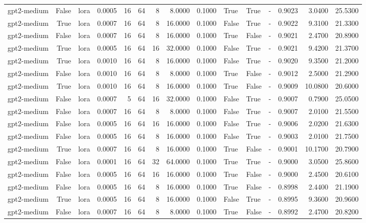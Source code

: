 \begin{tabular}{lrlrrrrrrlllrrr}
gpt2-medium & False & lora & 0.0005 & 16 & 64 & 8 & 8.0000 & 0.1000 & True & True & - & 0.9023 & 3.0400 & 25.5300 \\
gpt2-medium & True & lora & 0.0007 & 16 & 64 & 8 & 16.0000 & 0.1000 & False & True & - & 0.9022 & 9.3100 & 21.3300 \\
gpt2-medium & False & lora & 0.0007 & 16 & 64 & 8 & 16.0000 & 0.1000 & True & False & - & 0.9021 & 2.4700 & 20.8900 \\
gpt2-medium & True & lora & 0.0005 & 16 & 64 & 16 & 32.0000 & 0.1000 & False & True & - & 0.9021 & 9.4200 & 21.3700 \\
gpt2-medium & True & lora & 0.0010 & 16 & 64 & 8 & 16.0000 & 0.1000 & False & True & - & 0.9020 & 9.3500 & 21.2000 \\
gpt2-medium & False & lora & 0.0010 & 16 & 64 & 8 & 8.0000 & 0.1000 & True & False & - & 0.9012 & 2.5000 & 21.2900 \\
gpt2-medium & True & lora & 0.0010 & 16 & 64 & 8 & 16.0000 & 0.1000 & True & False & - & 0.9009 & 10.0800 & 20.6000 \\
gpt2-medium & False & lora & 0.0007 & 5 & 64 & 16 & 32.0000 & 0.1000 & False & True & - & 0.9007 & 0.7900 & 25.0500 \\
gpt2-medium & False & lora & 0.0007 & 16 & 64 & 8 & 8.0000 & 0.1000 & False & True & - & 0.9007 & 2.0100 & 21.5500 \\
gpt2-medium & False & lora & 0.0005 & 16 & 64 & 16 & 16.0000 & 0.1000 & False & True & - & 0.9006 & 2.0200 & 21.6300 \\
gpt2-medium & False & lora & 0.0005 & 16 & 64 & 8 & 16.0000 & 0.1000 & False & True & - & 0.9003 & 2.0100 & 21.7500 \\
gpt2-medium & True & lora & 0.0007 & 16 & 64 & 8 & 16.0000 & 0.1000 & True & False & - & 0.9001 & 10.1700 & 20.7900 \\
gpt2-medium & False & lora & 0.0001 & 16 & 64 & 32 & 64.0000 & 0.1000 & True & True & - & 0.9000 & 3.0500 & 25.8600 \\
gpt2-medium & False & lora & 0.0005 & 16 & 64 & 16 & 16.0000 & 0.1000 & True & False & - & 0.9000 & 2.4500 & 20.6100 \\
gpt2-medium & False & lora & 0.0005 & 16 & 64 & 8 & 16.0000 & 0.1000 & True & False & - & 0.8998 & 2.4400 & 21.1900 \\
gpt2-medium & True & lora & 0.0005 & 16 & 64 & 8 & 16.0000 & 0.1000 & False & True & - & 0.8995 & 9.3600 & 20.9600 \\
gpt2-medium & False & lora & 0.0007 & 16 & 64 & 8 & 8.0000 & 0.1000 & True & False & - & 0.8992 & 2.4700 & 20.8200 \\

\end{tabular}
